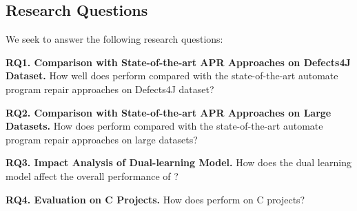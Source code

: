 \subsection{Research Questions}

We seek to answer the following research questions:

\noindent\textbf{RQ1. Comparison with State-of-the-art APR Approaches on Defects4J Dataset.}  How well does {\tool} perform compared with the state-of-the-art automate program repair approaches on Defects4J dataset?


\noindent\textbf{RQ2. Comparison with State-of-the-art APR Approaches
  on Large Datasets.}  How does {\tool} perform compared with the
state-of-the-art automate program repair approaches on large datasets?


\noindent\textbf{RQ3. Impact Analysis of Dual-learning Model.} How does the dual learning model affect the overall performance of {\tool}?


\noindent\textbf{RQ4. Evaluation on C Projects.} How does {\tool} perform on C projects?
